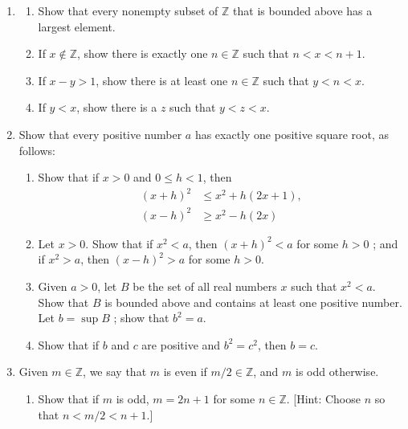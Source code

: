 \begin{enumerate}[itemsep=0.4em, parsep=0pt, topsep=0pt, partopsep=0pt, leftmargin=*, label=\arabic*., ref=\arabic*]
\begin{enumerate}[itemsep=0.2em, parsep=0pt, topsep=0pt, partopsep=0pt, leftmargin=*, label=(\alph*), align=left]
  \end{enumerate}
\item
  \begin{enumerate}[itemsep=0.2em, parsep=0pt, topsep=0pt, partopsep=0pt, leftmargin=*, label=(\alph*), align=left]
  \item Show that every nonempty subset of \(\mathbb{Z}\) that is bounded above has a largest element.
  \item If \(x \notin \mathbb{Z}\), show there is exactly one \(n \in \mathbb{Z}\) such that \(n < x < n + 1\).
  \item If \(x - y > 1\), show there is at least one \(n \in \mathbb{Z}\) such that \(y < n < x\).
  \item If \(y < x\), show there is a  \(z\) such that \(y < z < x\).
  \end{enumerate}
\item Show that every positive number \(a\) has exactly one positive square root, as follows:
  \begin{enumerate}[itemsep=0.2em, parsep=0pt, topsep=0pt, partopsep=0pt, leftmargin=*, label=(\alph*), align=left]
  \item Show that if \(x > 0\) and \(0 \leq h < 1\), then \[ \begin{aligned} {( x + h) }^{2} &\leq {x}^{2} + h({{2x} + 1}), \\ {( x - h) }^{2} &\geq {x}^{2} - h({2x}) \end{aligned} \]
  \item Let \(x > 0\). Show that if \(x^{2} < a\), then \({( x + h) }^{2} < a\) for some \(h > 0\) ; and if \(x^{2} > a\), then \({( x - h) }^{2} > a\) for some \(h > 0\).
  \item Given \(a > 0\), let \(B\) be the set of all real numbers \(x\) such that \(x^{2} < a\). Show that \(B\) is bounded above and contains at least one positive number. Let \(b = \sup B\) ; show that \(b^{2} = a\).
  \item Show that if \(b\) and \(c\) are positive and \(b^{2} = c^{2}\), then \(b = c\).
  \end{enumerate}
\item Given \(m \in \mathbb{Z}\), we say that \(m\) is even if \(m/2 \in \mathbb{Z}\), and \(m\) is odd otherwise.
  \begin{enumerate}[itemsep=0.2em, parsep=0pt, topsep=0pt, partopsep=0pt, leftmargin=*, label=(\alph*), align=left]
  \item Show that if \(m\) is odd, \(m = {2n} + 1\) for some \(n \in \mathbb{Z}\). [Hint: Choose \(n\) so that \(n < m/2 < n + 1\).]

\end{enumerate}
\end{enumerate}
